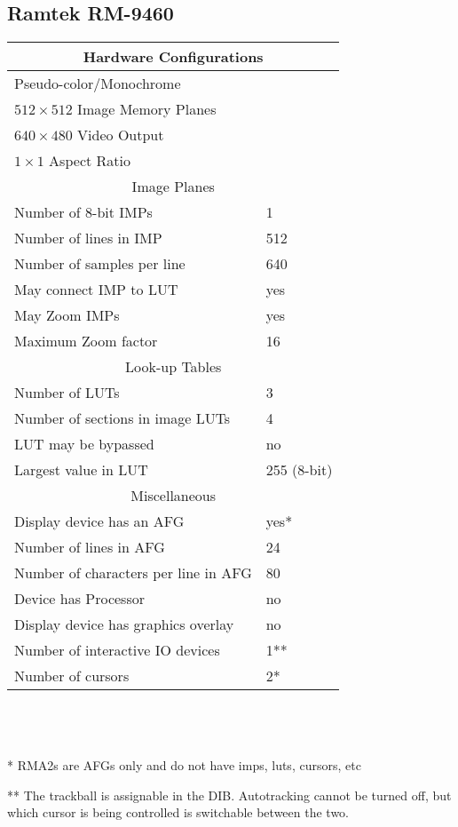 \subsection{Ramtek RM-9460}
\begin{tabular}{|l l|}
\hline
\multicolumn{2}{|c|}{Hardware Configurations}\\
\hline
Pseudo-color/Monochrome & \\
$512 \times 512$ Image Memory Planes & \\
$640 \times 480$ Video Output & \\
$1 \times 1$ Aspect Ratio & \\ 
\hline \hline 
\multicolumn{2}{|c|}{Image Planes}\\ \hline
Number of 8-bit IMPs & 1 \\
Number of lines in IMP & 512\\
Number of samples per line & 640\\
May connect IMP to LUT & yes\\
May Zoom IMPs & yes\\
Maximum Zoom factor & 16\\
\hline \hline 
\multicolumn{2}{|c|}{Look-up Tables}\\ 
\hline
Number of LUTs & 3\\
Number of sections in image LUTs & 4\\
LUT may be bypassed & no\\
Largest value in LUT & 255 (8-bit)\\
\hline \hline 
\multicolumn{2}{|c|}{Miscellaneous}\\ 
\hline
Display device has an AFG & yes* \\
Number of lines in AFG & 24 \\
Number of characters per line in AFG & 80 \\
Device has Processor & no\\ 
Display device has graphics overlay & no\\
Number of interactive IO devices & 1**\\
Number of cursors & 2*\\
\hline
\end{tabular}
\\
\\
\\
* RMA2s are AFGs only and do not have imps, luts, cursors, etc

** The trackball is assignable in the DIB.  Autotracking cannot
be turned off, but which cursor is being controlled is switchable
between the two.

